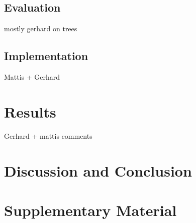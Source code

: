 \documentclass[10pt, a4paper]{article}
\begin{document}
\subsection{Evaluation}

mostly gerhard on trees

\subsection{Implementation}

Mattis + Gerhard

\section{Results}

Gerhard + mattis comments

\section{Discussion and Conclusion}

\section{Supplementary Material}




\end{document}
